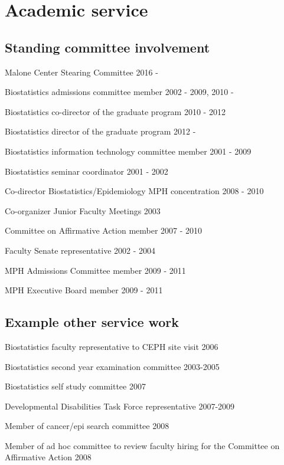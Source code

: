 \documentclass[12pt]{article}
\begin{document}
\section*{Academic service} 
\subsection*{Standing committee involvement}
\begin{description}
\item Malone Center Stearing Committee 2016 -
\item Biostatistics admissions committee member 2002 - 2009, 2010 -
\item Biostatistics co-director of the graduate program 2010 - 2012
\item Biostatistics director of the graduate program 2012 - 
\item Biostatistics information technology committee member 2001 - 2009 
\item Biostatistics seminar coordinator 2001 - 2002 
\item Co-director Biostatistics/Epidemiology MPH concentration 2008 - 2010
\item Co-organizer Junior Faculty Meetings 2003 
\item Committee on Affirmative Action member 2007 - 2010
\item Faculty Senate representative 2002 - 2004 
\item MPH Admissions Committee member 2009 - 2011
\item MPH Executive Board member 2009 -  2011
\end{description}

\subsection*{Example other service work}
\begin{description}
\item Biostatistics faculty representative to CEPH site visit 2006 
\item Biostatistics second year examination committee 2003-2005 
\item Biostatistics self study committee 2007 
\item Developmental Disabilities Task Force representative 2007-2009 
\item Member of cancer/epi search committee 2008 
\item Member of ad hoc committee to review faculty hiring for the Committee on Affirmative Action 2008 
\end{description}
\end{document}
